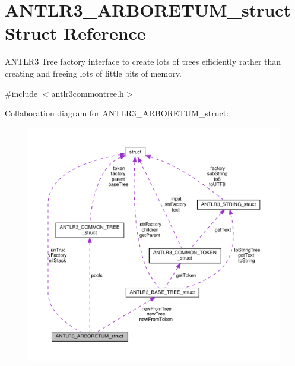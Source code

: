 \hypertarget{struct_a_n_t_l_r3___a_r_b_o_r_e_t_u_m__struct}{\section{A\-N\-T\-L\-R3\-\_\-\-A\-R\-B\-O\-R\-E\-T\-U\-M\-\_\-struct Struct Reference}
\label{struct_a_n_t_l_r3___a_r_b_o_r_e_t_u_m__struct}
}


A\-N\-T\-L\-R3 Tree factory interface to create lots of trees efficiently rather than creating and freeing lots of little bits of memory.  




{\ttfamily \#include $<$antlr3commontree.\-h$>$}



Collaboration diagram for A\-N\-T\-L\-R3\-\_\-\-A\-R\-B\-O\-R\-E\-T\-U\-M\-\_\-struct\-:
\nopagebreak
\begin{figure}[H]
\begin{center}
\leavevmode
\includegraphics[width=350pt]{struct_a_n_t_l_r3___a_r_b_o_r_e_t_u_m__struct__coll__graph}
\end{center}
\end{figure}
